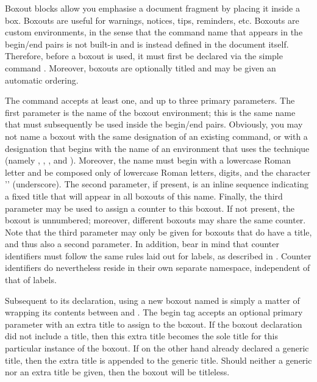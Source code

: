 Boxout blocks allow you emphasise a document fragment by placing it inside a box.
Boxouts are useful for warnings, notices, tips, reminders, etc.  Boxouts are custom
environments, in the sense that the command name that appears in the begin/end pairs
is not built-in and is instead defined in the document itself.  Therefore, before a
boxout is used, it must first be declared via the simple command \mono{\\newboxout}.
Moreover, boxouts are optionally titled and may be given an automatic ordering.

The command \mono{\\newboxout} accepts at least one, and up to three primary parameters.
The first parameter is the name of the boxout environment; this is the same name that
must subsequently be used inside the begin/end pairs.  Obviously, you may not name a
boxout with the same designation of an existing command, or with a designation that
begins with the name of an environment that uses the  technique (namely
, , , and ). Moreover, the
name must begin with a lowercase Roman letter and be composed only of lowercase Roman
letters, digits, and the character '\mono{_}' (underscore).  The second parameter,
if present, is an inline sequence indicating a fixed title that will appear in all
boxouts of this name.  Finally, the third parameter may be used to assign a counter to
this boxout.  If not present, the boxout is unnumbered; moreover, different boxouts
may share the same counter.  Note that the third parameter may only be given for
boxouts that do have a title, and thus also a second parameter.  In addition, bear
in mind that counter identifiers must follow the same rules laid out for labels,
as described in .  Counter identifiers do nevertheless reside in
their own separate namespace, independent of that of labels.

Subsequent to its declaration, using a new boxout named  is
simply a matter of wrapping its contents between  and
.  The begin tag accepts an optional primary parameter with an
extra title to assign to the boxout.  If the \mono{\\newboxout} boxout declaration did
not include a title, then this extra title becomes the sole title for this particular
instance of the boxout.  If on the other hand \mono{\\newboxout} already declared a
generic title, then the extra title is appended to the generic title.  Should neither
a generic nor an extra title be given, then the boxout will be titleless.

